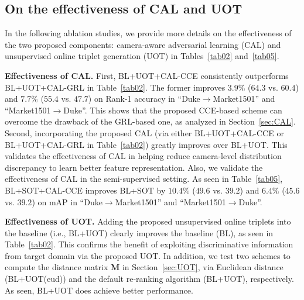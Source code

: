 \documentclass[10pt,twocolumn,letterpaper]{article}
\begin{document}
 
 
\subsection{On the effectiveness of CAL and UOT}\label{sec:EXP-AS}
In the following ablation studies, we provide more details on the effectiveness of the two proposed components: camera-aware adversarial learning (CAL) and unsupervised online triplet generation (UOT) in Tables~\ref{tab02} and~\ref{tab05}.


\textbf{Effectiveness of CAL.}
First, BL+UOT+CAL-CCE consistently outperforms BL+UOT+CAL-GRL in Table~\ref{tab02}. The former improves $3.9\%$ ($64.3$ vs. $60.4$) and $7.7\%$ ($55.4$ vs. $47.7$) on Rank-1 accuracy in ``Duke$\rightarrow$Market1501'' and ``Market1501$\rightarrow$Duke''. This shows that the proposed CCE-based scheme can overcome the drawback of the GRL-based one, as analyzed in Section~\ref{sec:CAL}. Second, incorporating the proposed CAL (via either BL+UOT+CAL-CCE or BL+UOT+CAL-GRL in Table~\ref{tab02}) greatly improves over BL+UOT. This validates the effectiveness of CAL in helping reduce camera-level distribution discrepancy to learn better feature representation. Also, we validate the effectiveness of CAL in the semi-supervised setting. As seen in Table~\ref{tab05}, BL+SOT+CAL-CCE improves BL+SOT by $10.4\%$ ($49.6$ vs. $39.2$) and $6.4\%$ ($45.6$ vs. $39.2$) on mAP in ``Duke$\rightarrow$Market1501'' and ``Market1501$\rightarrow$Duke''. 
 
\textbf{Effectiveness of UOT.}
Adding the proposed unsupervised online triplets into the baseline (i.e., BL+UOT) clearly improves the baseline (BL), as seen in Table~\ref{tab02}. This confirms the benefit of exploiting discriminative information from target domain via the proposed UOT. In addition, we test two schemes to compute the distance matrix ${\mathbf M}$ in Section~\ref{sec:UOT}, via Euclidean distance (BL+UOT(eud)) and the default re-ranking algorithm (BL+UOT), respectively. As seen, BL+UOT does achieve better performance. 
 
\end{document}
